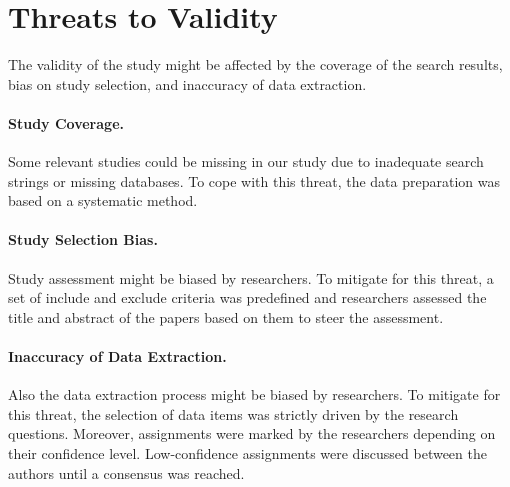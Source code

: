 \section{Threats to Validity}


The validity of the study might be affected by the coverage of the search results, bias on study selection, and inaccuracy of data extraction.
\paragraph{Study Coverage.}
Some relevant studies could be missing in our study due to inadequate search strings or missing databases.
To cope with this threat, the data preparation was based on a systematic method.
\vspace{-5pt}
\paragraph{Study Selection Bias.}
Study assessment might be biased by researchers.
To mitigate for this threat, a set of include and exclude criteria was predefined and researchers assessed the title and abstract of the papers based on them to steer the assessment.
\vspace{-5pt}
\paragraph{Inaccuracy of Data Extraction.}
Also the data extraction process might be biased by researchers.
To mitigate for this threat, the selection of data items was strictly driven by the research questions.
Moreover, assignments were marked by the researchers depending on their confidence level. Low-confidence assignments were discussed between the authors until a consensus was reached.